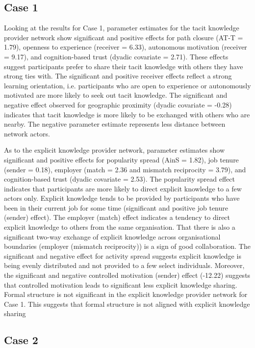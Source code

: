 \subsection{Case 1}

Looking at the results for Case 1, parameter estimates for the tacit knowledge provider network show significant and positive effects for path closure (AT-T = 1.79), openness to experience (receiver = 6.33), autonomous motivation (receiver = 9.17), and cognition-based trust (dyadic covariate = 2.71). These effects suggest participants prefer to share their tacit knowledge with others they have strong ties with. The significant and positive receiver effects reflect a strong learning orientation, i.e. participants who are open to experience or autonomously motivated are more likely to seek out tacit knowledge. The significant and negative effect observed for geographic proximity (dyadic covariate = -0.28) indicates that tacit knowledge is more likely to be exchanged with others who are nearby. The negative parameter estimate represents less distance between network actors. \medskip

As to the explicit knowledge provider network, parameter estimates show significant and positive effects for popularity spread (AinS = 1.82), job tenure (sender = 0.18), employer (match = 2.36 and mismatch reciprocity = 3.79), and cognition-based trust (dyadic covariate = 2.53). The popularity spread effect indicates that participants are more likely to direct explicit knowledge to a few actors only. Explicit knowledge tends to be provided by participants who have been in their current job for some time (significant and positive job tenure (sender) effect). The employer (match) effect indicates a tendency to direct explicit knowledge to others from the same organisation. That there is also a significant two-way exchange of explicit knowledge across organisational boundaries (employer (mismatch reciprocity)) is a sign of good collaboration. The significant and negative effect for activity spread suggests explicit knowledge is being evenly distributed and not provided to a few select individuals. Moreover, the significant and negative controlled motivation (sender) effect (-12.22) suggests that controlled motivation leads to significant less explicit knowledge sharing. Formal structure is not significant in the explicit knowledge provider network for Case 1. This suggests that formal structure is not aligned with explicit knowledge sharing

\subsection{Case 2}

